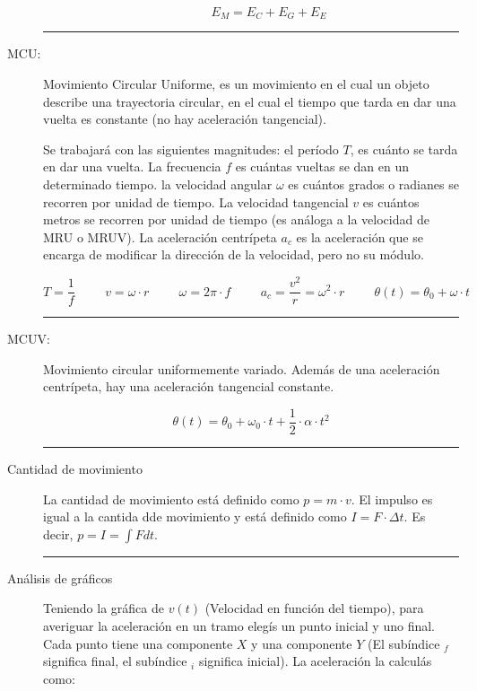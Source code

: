 \begin{description}
\begin{description}
        $$E_M = E_C + E_G + E_E$$
        
    \end{description}
    \hrule 
    \item[MCU:]\hfil

    Movimiento Circular Uniforme, es un movimiento en el cual un objeto describe una trayectoria circular, en el cual el tiempo que tarda en dar una vuelta es constante (no hay aceleración tangencial).

    Se trabajará con las siguientes magnitudes: el período $T$, es cuánto se tarda en dar una vuelta. La frecuencia $f$ es cuántas vueltas se dan en un determinado tiempo. la velocidad angular $\omega$ es cuántos grados o radianes se recorren por unidad de tiempo. La velocidad tangencial $v$ es cuántos metros se recorren por unidad de tiempo (es análoga a la velocidad de MRU o MRUV). La aceleración centrípeta $a_c$ es la aceleración que se encarga de modificar la dirección de la velocidad, pero no su módulo.
    
    $$ T = \dfrac{1}{f}
    \hspace{1cm}
    v = \omega\cdot r
    \hspace{1cm}
    \omega = 2\pi \cdot f
    \hspace{1cm}
    a_c = \dfrac{v^2}{r}=\omega^2\cdot r
    \hspace{1cm}
    \theta (t) = \theta _0 + \omega \cdot t
    $$
    \hrule

    \item[MCUV:]\hfil

    Movimiento circular uniformemente variado. Además de una aceleración centrípeta, hay una aceleración tangencial constante.

    $$\theta(t) = \theta_0 + \omega_0 \cdot t + \dfrac{1}{2} \cdot \alpha \cdot t^2$$

    \skipline
    \hrule

    \item[Cantidad de movimiento]\hfill

    La cantidad de movimiento está definido como $p = m\cdot v$. El impulso es igual a la cantida dde movimiento y está definido como $I=F\cdot \Delta t$. Es decir, $p=I=\int F dt$.
    
    \hrule
    
    \item[Análisis de gráficos]\hfill
    
    Teniendo la gráfica de $v(t)$ (Velocidad en función del tiempo), para averiguar la aceleración en un tramo elegís un punto inicial y uno final. Cada punto tiene una componente $X$ y una componente $Y$ (El subíndice $_f$ significa final, el subíndice $_i$ significa inicial). La aceleración la calculás como:
    

\end{description}
